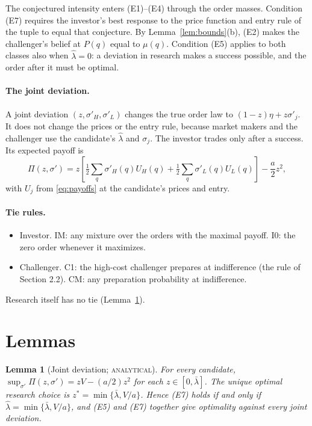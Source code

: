 \documentclass[12pt]{article}
\newtheorem{lemma}{Lemma}
\theoremstyle{definition}
\theoremstyle{remark}
\newcommand{\lh}{\hat\lambda}
\newcommand{\lb}{\bar\lambda}
\newcommand{\st}[1]{\textsc{#1}}
\begin{document}
The conjectured intensity enters (E1)--(E4) through the order masses. Condition (E7) requires the investor's
best response to the price function and entry rule of the tuple to equal that conjecture. By
Lemma~\ref{lem:bounds}(b), (E2) makes the challenger's belief at $P(q)$ equal to $\mu(q)$. Condition (E5) applies to
both classes also when $\lh=0$: a deviation in research makes a success possible, and the order after it must be
optimal.

\paragraph{The joint deviation.} A joint deviation $(z,\sigma'_H,\sigma'_L)$ changes the true order law to
$(1-z)\eta+z\sigma'_j$. It does not change the prices or the entry rule, because market makers and the challenger
use the candidate's $\lh$ and $\sigma_j$. The investor trades only after a success. Its expected payoff is
\begin{equation}\label{eq:Pi}
\Pi(z,\sigma')=z\left[\tfrac12\sum_q\sigma'_H(q)U_H(q)+\tfrac12\sum_q\sigma'_L(q)U_L(q)\right]-\frac a2z^2 ,
\end{equation}
with $U_j$ from \eqref{eq:payoffs} at the candidate's prices and entry.

\paragraph{Tie rules.}
\begin{itemize}[nosep]
\item Investor. IM: any mixture over the orders with the maximal payoff. I0: the zero order whenever it maximizes.
\item Challenger. C1: the high-cost challenger prepares at indifference (the rule of Section 2.2).
  CM: any preparation probability at indifference.
\end{itemize}
Research itself has no tie (Lemma~\ref{lem:joint}).

\section{Lemmas}\label{sec:lemmas}

\begin{lemma}[Joint deviation; \st{analytical}]\label{lem:joint}
For every candidate, $\sup_{\sigma'}\Pi(z,\sigma')=zV-(a/2)z^2$ for each $z\in[0,\lb]$. The unique optimal
research choice is $z^*=\min\{\lb,V/a\}$. Hence (E7) holds if and only if $\lh=\min\{\lb,V/a\}$, and (E5) and (E7)
together give optimality against every joint deviation.
\end{lemma}
\end{document}
